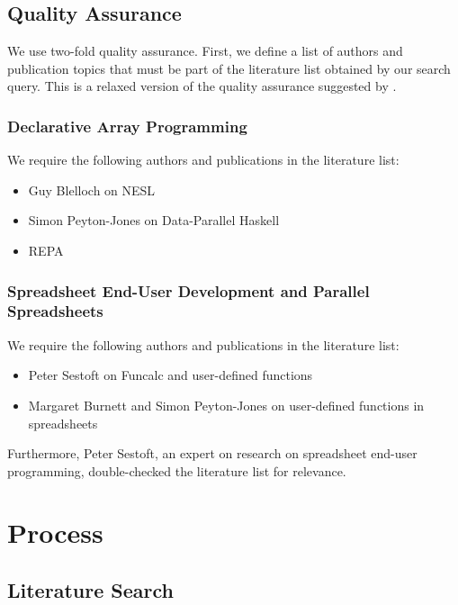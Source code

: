 \documentclass[a4paper]{article}
\begin{document}
\subsection{Quality Assurance}
\label{sec:quality-assurance}

We use two-fold quality assurance. First, we define a list of authors and publication topics that must be part of the literature list obtained by our search query. This is a relaxed version of the quality assurance suggested by \citet{keele2007guidelines}.

\subsubsection{Declarative Array Programming}

We require the following authors and publications in the literature list:

\begin{itemize}
\item Guy Blelloch on NESL
\item Simon Peyton-Jones on Data-Parallel Haskell
\item REPA
\end{itemize}

\subsubsection{Spreadsheet End-User Development and Parallel Spreadsheets}

We require the following authors and publications in the literature list:

\begin{itemize}
\item Peter Sestoft on Funcalc and user-defined functions
\item Margaret Burnett and Simon Peyton-Jones on user-defined
  functions in spreadsheets
\end{itemize}

Furthermore, Peter Sestoft, an expert on research on spreadsheet end-user programming, double-checked the literature list for relevance.

\section{Process}
\label{sec:process}

\subsection{Literature Search}
\label{sec:literature-search}
\end{document}

